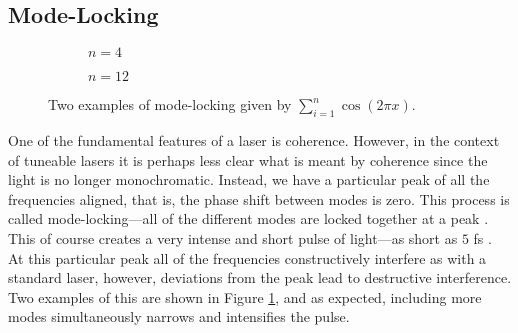 \subsection{Mode-Locking}
\begin{figure}[tbp]
\centering
\begin{subfigure}{0.5\textwidth}

\caption{$n = 4$}
\end{subfigure}%
\begin{subfigure}{0.5\textwidth}

\caption{$n = 12$}
\end{subfigure}
\caption[Two examples of mode-locking.]{Two examples of mode-locking given by $\displaystyle \sum_{i = 1}^n \cos \left( 2 \pi x \right)$.}
\label{fig:ml}
\end{figure}
One of the fundamental features of a laser is coherence. However, in the context of tuneable lasers it is perhaps less clear what is meant by coherence since the light is no longer monochromatic. Instead, we have a particular peak of all the frequencies aligned, that is, the phase shift between modes is zero. This process is called mode-locking---all of the different modes are locked together at a peak \cite{agrawal2013, hausbook, silfvast}. This of course creates a very intense and short pulse of light---as short as $5$ fs \cite{silfvast}. At this particular peak all of the frequencies constructively interfere as with a standard laser, however, deviations from the peak lead to destructive interference. Two examples of this are shown in Figure \ref{fig:ml}, and as expected, including more modes simultaneously narrows and intensifies the pulse. \\


